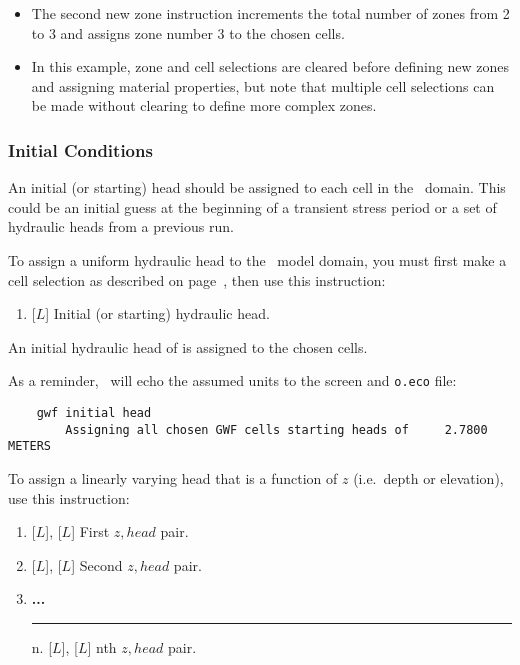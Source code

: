 {\begin{itemize}
        \texttt{[image: 3\_10c\_NewZonesJagged]}

    \item The second {\sf new zone} instruction increments the total number of zones from 2 to 3 and assigns zone number 3 to the chosen cells.
    \item In this example, zone and cell selections are cleared before defining new zones and assigning material properties, but note that multiple cell selections can be made without clearing to define more complex zones.
\end{itemize}

\subsubsection{Initial Conditions}  
An initial (or starting) head should be assigned to each cell in the \gwf\ domain.  This could be an initial guess at the beginning of a transient stress period or a set of hydraulic heads from a previous run.

To assign a uniform hydraulic head to the \gwf\ model domain, you must first make a cell selection as described on page~\pageref{page:cellSelect}, then use this instruction:

    {
        \squish
        \begin{enumerate}
        \item {} [$L$]  Initial (or starting) hydraulic head.
        \end{enumerate}
          An initial hydraulic head  of  is assigned to the chosen cells.
    }

As a reminder, \mut\ will echo the assumed units to the screen and \texttt{o.eco} file:
\begin{verbatim}
    gwf initial head
    	Assigning all chosen GWF cells starting heads of     2.7800         METERS

\end{verbatim}


To assign a linearly varying head that is a function of $z$ (i.e.\ depth or elevation), use this instruction:
    {
    \squish
    \begin{enumerate}
    \item {} [$L$],  [$L$]  First $z, head$ pair.
    \item {} [$L$],  [$L$]  Second $z, head$ pair.
    \item \textbf{...}\\
     \hspace*{-.27in}\rule{0.in}{.24in} n.  [$L$],   [$L$]  nth $z, head$  pair.
    \end{enumerate}

}}
